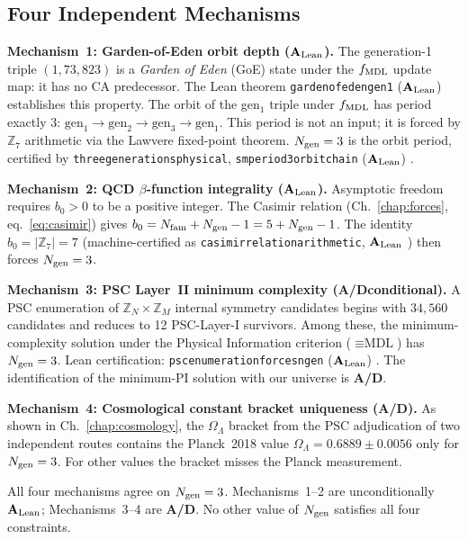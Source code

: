 \documentclass[11pt,openany]{book}
\theoremstyle{remark}
\newcommand{\MDL}{\text{MDL}}
\newcommand{\ZS}{\mathbb{Z}_7}
\newcommand{\lean}[1]{%
  \penalty-100
  \begingroup\def\_{\textunderscore\allowbreak}\texttt{#1}\endgroup}
\newcommand{\Ngen}{N_{\rm gen}}
\newcommand{\Nfam}{N_{\rm fam}}
\newcommand{\CatAL}{\ensuremath{\textbf{A}_{\rm Lean}}}
\newcommand{\CatAD}{\textbf{A/D}}
\begin{document}
\subsection*{Four Independent Mechanisms}

\textbf{Mechanism~1: Garden-of-Eden orbit depth (\CatAL).}
The generation-1 triple $(1, 73, 823)$ is a \emph{Garden of Eden} (GoE) state under
the $f_{\rm MDL}$ update map: it has no CA predecessor.  The Lean theorem
\lean{garden\_of\_eden\_gen1} (\CatAL) \cite{SpivackGTEQCDStructure,SpivackBraidAtlas}
establishes this property.  The orbit of the gen$_1$ triple under $f_{\rm MDL}$
has period exactly 3: $\text{gen}_1 \to \text{gen}_2 \to \text{gen}_3 \to \text{gen}_1$.
This period is not an input; it is forced by $\ZS$ arithmetic via the Lawvere
fixed-point theorem.  $\Ngen = 3$ is the orbit period, certified by
\lean{three\_generations\_physical}, \lean{sm\_period3\_orbit\_chain} (\CatAL)
\cite{SpivackBraidAtlas,SpivackGTEQCDStructure}.

\textbf{Mechanism~2: QCD $\beta$-function integrality (\CatAL).}
Asymptotic freedom requires $b_0 > 0$ to be a positive integer.  The Casimir relation
(Ch.~\ref{chap:forces}, eq.~\eqref{eq:casimir}) gives
$b_0 = \Nfam + \Ngen - 1 = 5 + \Ngen - 1$.  The identity $b_0 = |\ZS| = 7$
(machine-certified as \lean{casimir\_relation\_arithmetic}, \CatAL
\cite{SpivackGTEQCDStructure}) then forces $\Ngen = 3$.

\textbf{Mechanism~3: PSC Layer~II minimum complexity (\CatAD conditional).}
A PSC enumeration of $\mathbb{Z}_N \times \mathbb{Z}_M$ internal symmetry candidates
begins with $34{,}560$ candidates and reduces to 12 PSC-Layer-I survivors.  Among these,
the minimum-complexity solution under the Physical Information criterion ($\equiv \MDL$)
has $\Ngen = 3$.  Lean certification: \lean{psc\_enumeration\_forces\_ngen\_3} (\CatAL)
\cite{SpivackGTEPolynomialUFT}.  The identification of the minimum-PI solution with our
universe is \CatAD.

\textbf{Mechanism~4: Cosmological constant bracket uniqueness (\CatAD).}
As shown in Ch.~\ref{chap:cosmology}, the $\Omega_\Lambda$ bracket from the PSC
adjudication of two independent routes contains the Planck~2018 value
$\Omega_\Lambda = 0.6889 \pm 0.0056$ only for $\Ngen = 3$.  For other values the
bracket misses the Planck measurement.

All four mechanisms agree on $\Ngen = 3$.  Mechanisms~1--2 are unconditionally \CatAL;
Mechanisms~3--4 are \CatAD.  No other value of $\Ngen$ satisfies all four constraints.
\end{document}
